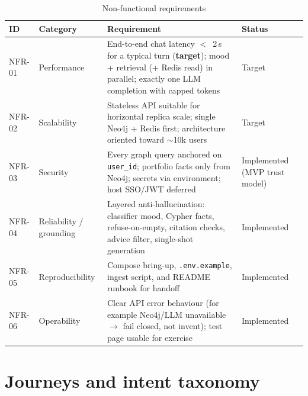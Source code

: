 \begin{table}[!htbp]
\centering
\small
\caption{Non-functional requirements}
\label{tab:nfrs}
\begin{tabularx}{\textwidth}{@{}
  >{\centering\arraybackslash}p{}
  >{\raggedright\arraybackslash}p{}
  >{\raggedright\arraybackslash}X
  >{\centering\arraybackslash}p{}
  @{}}
\toprule
\textbf{ID} & \textbf{Category} & \textbf{Requirement} & \textbf{Status} \\
\midrule
NFR-01 &
Performance &
End-to-end chat latency $<$~2\,s for a typical turn (\textbf{target}); mood + retrieval (+ Redis read) in parallel; exactly one LLM completion with capped tokens &
Target \\
\addlinespace
NFR-02 &
Scalability &
Stateless API suitable for horizontal replica scale; single Neo4j + Redis first; architecture oriented toward $\sim$10k users &
Target \\
\addlinespace
NFR-03 &
Security &
Every graph query anchored on \texttt{user\_id}; portfolio facts only from Neo4j; secrets via environment; host SSO/JWT deferred &
Implemented (MVP trust model) \\
\addlinespace
NFR-04 &
Reliability / grounding &
Layered anti-hallucination: classifier mood, Cypher facts, refuse-on-empty, citation checks, advice filter, single-shot generation &
Implemented \\
\addlinespace
NFR-05 &
Reproducibility &
Compose bring-up, \texttt{.env.example}, ingest script, and README runbook for handoff &
Implemented \\
\addlinespace
NFR-06 &
Operability &
Clear API error behaviour (for example Neo4j/LLM unavailable $\rightarrow$ fail closed, not invent); test page usable for exercise &
Implemented \\
\bottomrule
\end{tabularx}
\end{table}

\section{Journeys and intent taxonomy}

